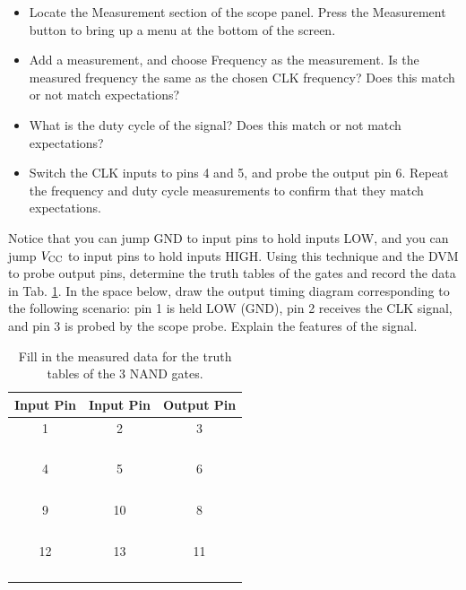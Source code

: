 \documentclass{article}
\begin{document}
\begin{itemize}
\item Locate the Measurement section of the scope panel.  Press the Measurement button to bring up a menu at the bottom of the screen.
\item Add a measurement, and choose Frequency as the measurement.  Is the measured frequency the same as the chosen CLK frequency?  Does this match or not match expectations?
\item What is the duty cycle of the signal?  Does this match or not match expectations?
\item Switch the CLK inputs to pins 4 and 5, and probe the output pin 6.  Repeat the frequency and duty cycle measurements to confirm that they match expectations.
\end{itemize}

Notice that you can jump GND to input pins to hold inputs LOW, and you can jump $V_{\rm CC}$ to input pins to hold inputs HIGH.  Using this technique and the DVM to probe output pins, determine the truth tables of the gates and record the data in Tab. \ref{tab:data}.  In the space below, draw the output timing diagram corresponding to the following scenario: pin 1 is held LOW (GND), pin 2 receives the CLK signal, and pin 3 is probed by the scope probe.  Explain the features of the signal.

\begin{table}
\centering
\begin{tabular}{| c | c | c |}
\hline
Input Pin & Input Pin & Output Pin \\ \hline \hline
1 & 2 & 3 \\ \hline \hline
& & \\ \hline
& & \\ \hline
& & \\ \hline
& & \\ \hline
4 & 5 & 6 \\ \hline \hline
& & \\ \hline
& & \\ \hline
& & \\ \hline
& & \\ \hline
9 & 10 & 8 \\ \hline \hline
& & \\ \hline
& & \\ \hline
& & \\ \hline
& & \\ \hline
12 & 13 & 11 \\ \hline \hline
& & \\ \hline
& & \\ \hline
& & \\ \hline
& & \\ \hline
\end{tabular}
\caption{\label{tab:data} Fill in the measured data for the truth tables of the 3 NAND gates.}
\end{table}
\end{document}
